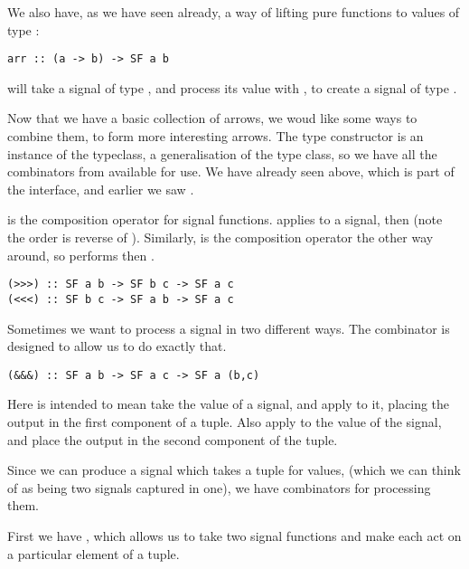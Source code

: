 We also have, as we have seen already, a way of lifting pure functions  to values of type :

\begin{lstlisting}
arr :: (a -> b) -> SF a b
\end{lstlisting}

\noindent {} will take a signal of type , and process its value with , to create a signal of type .

Now that we have a basic collection of arrows, we woud like some ways to combine them, to form more interesting arrows. The type constructor  is an instance of the  typeclass, a generalisation of the  type class, so we have all the combinators from  available for use. We have already seen  above, which is part of the  interface, and earlier we saw \hask{(>>>)}.

\hask{(>>>)} is the composition operator for signal functions.  applies  to a signal, then  (note the order is reverse of ). Similarly, \hask{(<<<)} is the composition operator the other way around, so  performs  then .

\begin{lstlisting}
(>>>) :: SF a b -> SF b c -> SF a c
(<<<) :: SF b c -> SF a b -> SF a c
\end{lstlisting}

Sometimes we want to process a signal in two different ways. The combinator \hask{(\&\&\&)} is designed to allow us to do exactly that.

\begin{lstlisting}
(&&&) :: SF a b -> SF a c -> SF a (b,c)
\end{lstlisting}

\noindent Here  is intended to mean take the value of a signal, and apply  to it, placing the output in the first component of a tuple. Also apply  to the value of the signal, and place the output in the second component of the tuple.

Since we can produce a signal which takes a tuple for values, (which we can think of as being two signals captured in one), we have combinators for processing them.

First we have \hask{(***)}, which allows us to take two signal functions and make each act on a particular element of a tuple.

